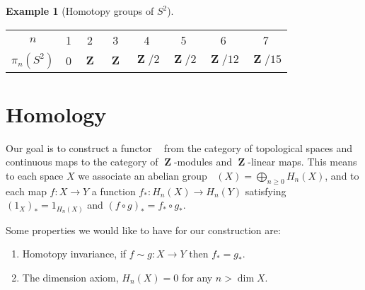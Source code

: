 \documentclass[10pt,]{article}
\theoremstyle{plain}
\theoremstyle{definition}
\newtheorem{example}[theorem]{Example}
\renewenvironment{table}%
{\begin{mbxtable}\setcounter{mbxtable}{\value{theorem}}\stepcounter{theorem}}%
{\end{mbxtable}}
\DeclareMathOperator{\dim}{dim}
\DeclareMathOperator{\ZZ}{\mathbf{Z}}
\DeclareMathOperator{\H}{H_*}
\begin{document}
\begin{example}[Homotopy groups of \(S^2\)]\label{example-3}
\begin{table}
\centering
\begin{tabular}{*{8}{c}}
\(n\)&1&2&3&4&5&6&7\\
\(\pi_n(S^2)\)&0&\(\ZZ\)&\(\ZZ\)&\(\ZZ/2\)&\(\ZZ/2\)&\(\ZZ/12\)&\(\ZZ/15\)\\
\end{tabular}
\end{table}
\end{example}
\typeout{************************************************}
\typeout{************************************************}
\section[Homology]{Homology}\label{section-3}

                Our goal is to construct a functor \(\H\) from the category of topological spaces and continuous maps to the category of \(\ZZ\)-modules and \(\ZZ\)-linear maps.
                This means to each space \(X\) we associate an abelian group \(\H(X) = \bigoplus_{n\ge 0}H_n(X)\), and to each map \(f\colon X \to Y\) a function \(f_*\colon H_n(X) \to H_n(Y)\) satisfying \((1_X)_* = 1_{H_n(X)}\) and \((f\circ g)_* = f_* \circ g_*\).
\par

                Some properties we would like to have for our construction are:
                \begin{enumerate}
\item{}Homotopy invariance, if \(f \sim g \colon X \to Y\) then \(f_* = g_*\).\item{}The dimension axiom, \(H_n(X) = 0\) for any \(n > \dim X\).\end{enumerate}

\typeout{************************************************}
\typeout{************************************************}
\end{document}
